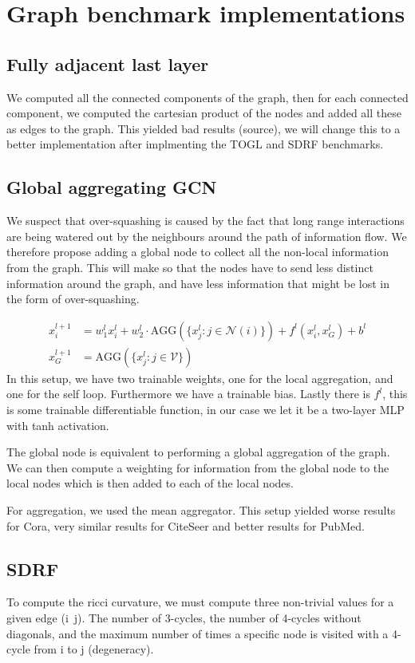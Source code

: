 \documentclass[a4paper,12pt]{article}
\begin{document}
\section{Graph benchmark implementations}
\subsection{Fully adjacent last layer}
We computed all the connected components of the graph, then for each connected component, we computed the cartesian product of the nodes and added all these as edges to the graph.
This yielded bad results (source), we will change this to a better implementation after implmenting the TOGL and SDRF benchmarks.

\subsection{Global aggregating GCN}
We suspect that over-squashing is caused by the fact that long range interactions are being 
watered out by the neighbours around the path of information flow. 
We therefore propose adding a global node to collect all the non-local information
from the graph. This will make so that the nodes have to send less distinct information
around the graph, and have less information that might be lost in the form of
over-squashing.

\begin{align}
  x^{l+1}_i &= w^l_1 x^l_i + w^l_2 \cdot \text{AGG}\left(\{x^l_j: j \in \mathcal{N}(i) \} \right) + f^l(x^l_i, x^l_G) + b^l\\
  x^{l+1}_G &= \text{AGG}\left(\{x^l_j: j \in \mathcal{V}\} \right)
\end{align}
In this setup, we have two trainable weights, one for the local aggregation, and one for the self loop. Furthermore we have a trainable bias. Lastly there is \(f^l\), this is some trainable differentiable function, in our case we let it be a two-layer MLP with tanh activation.

The global node is equivalent to performing a global aggregation of the graph.
We can then compute a weighting for information from the global node to the local nodes which
is then added to each of the local nodes.

For aggregation, we used the mean aggregator. This setup yielded worse results for Cora,
very similar results for CiteSeer and better results for PubMed.

\subsection{SDRF}
To compute the ricci curvature, we must compute three non-trivial values for a given edge (i~j). The number of 3-cycles, the number of 4-cycles without diagonals, and the maximum number of times a specific node is visited with a 4-cycle from i to j (degeneracy).
\end{document}
